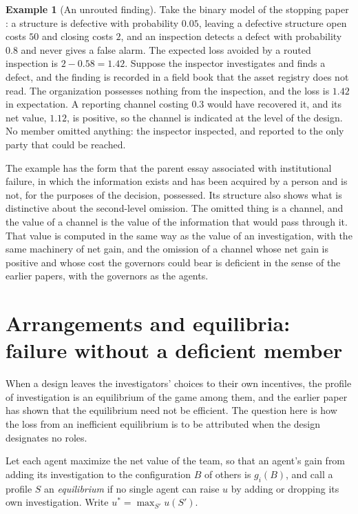 \documentclass[11pt]{article}
\theoremstyle{plain}
\theoremstyle{definition}
\newtheorem{example}{Example}
\begin{document}
\begin{example}[An unrouted finding]\label{ex:routing}
Take the binary model of the stopping paper \cite{flyxion2026stop}: a structure is defective with probability $0.05$, leaving a defective structure open costs $50$ and closing costs $2$, and an inspection detects a defect with probability $0.8$ and never gives a false alarm. The expected loss avoided by a routed inspection is $2-0.58=1.42$. Suppose the inspector investigates and finds a defect, and the finding is recorded in a field book that the asset registry does not read. The organization possesses nothing from the inspection, and the loss is $1.42$ in expectation. A reporting channel costing $0.3$ would have recovered it, and its net value, $1.12$, is positive, so the channel is indicated at the level of the design. No member omitted anything: the inspector inspected, and reported to the only party that could be reached.
\end{example}

The example has the form that the parent essay associated with institutional failure, in which the information exists and has been acquired by a person and is not, for the purposes of the decision, possessed. Its structure also shows what is distinctive about the second-level omission. The omitted thing is a channel, and the value of a channel is the value of the information that would pass through it. That value is computed in the same way as the value of an investigation, with the same machinery of net gain, and the omission of a channel whose net gain is positive and whose cost the governors could bear is deficient in the sense of the earlier papers, with the governors as the agents.

\section{Arrangements and equilibria: failure without a deficient member}\label{sec:blameless}

When a design leaves the investigators' choices to their own incentives, the profile of investigation is an equilibrium of the game among them, and the earlier paper has shown that the equilibrium need not be efficient. The question here is how the loss from an inefficient equilibrium is to be attributed when the design designates no roles.

Let each agent maximize the net value of the team, so that an agent's gain from adding its investigation to the configuration $B$ of others is $g_i(B)$, and call a profile $S$ an \emph{equilibrium} if no single agent can raise $u$ by adding or dropping its own investigation. Write $u^*=\max_{S'}u(S')$.
\end{document}
